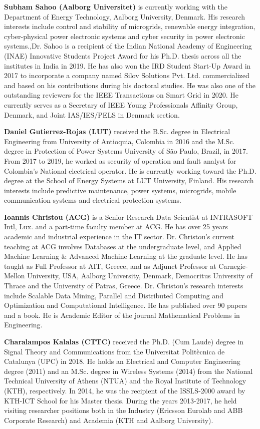 \textbf{Subham Sahoo (Aalborg Universitet)} is currently working with the Department of Energy Technology, Aalborg University, Denmark. His research interests include control and stability of microgrids, renewable energy integration, cyber-physical power electronic systems and cyber security in power electronic systems.,Dr. Sahoo is a recipient of the Indian National Academy of Engineering (INAE) Innovative Students Project Award for his Ph.D. thesis across all the institutes in India in 2019. He has also won the IRD Student Start-Up Award in 2017 to incorporate a company named Silov Solutions Pvt. Ltd. commercialized and based on his contributions during his doctoral studies. He was also one of the outstanding reviewers for the IEEE Transactions on Smart Grid in 2020. He currently serves as a Secretary of IEEE Young Professionals Affinity Group, Denmark, and Joint IAS/IES/PELS in Denmark section.

\textbf{Daniel Gutierrez-Rojas (LUT)} received the B.Sc. degree in Electrical Engineering from University of Antioquia, Colombia in 2016 and the M.Sc. degree in Protection of Power Systems University of São
Paulo, Brazil, in 2017. From 2017 to 2019, he worked as security of operation and fault analyst for Colombia’s National electrical operator. He is currently working toward the Ph.D. degree at the School of Energy Systems at LUT University, Finland. His research interests include predictive maintenance, power systems, microgrids, mobile communication systems and electrical protection systems.


\textbf{Ioannis Christou (ACG)} is a Senior Research Data Scientist at INTRASOFT Intl, Lux. and a part-time faculty member at ACG. He has over 25 years academic and industrial experience in the IT sector. Dr. Christou’s current teaching at ACG involves Databases at the undergraduate level, and Applied Machine Learning \& Advanced Machine Learning at the graduate level. He has taught as Full Professor at AIT, Greece, and as Adjunct Professor at Carnegie-Mellon University, USA, Aalborg University, Denmark, Democritus University of Thrace and the University of Patras, Greece. Dr. Christou’s research interests include Scalable Data Mining, Parallel and Distributed Computing and Optimization and Computational Intelligence. He has published over 90 papers and a book. He is Academic Editor of the journal Mathematical Problems in Engineering.

\textbf{Charalampos Kalalas (CTTC)} received the Ph.D. (Cum Laude) degree in Signal Theory and Communications from the Universitat Politècnica de Catalunya (UPC) in 2018. He holds an Electrical and Computer Engineering degree (2011) and an M.Sc. degree in Wireless Systems (2014) from the National Technical University of Athens (NTUA) and the Royal Institute of Technology (KTH), respectively. In 2014, he was the recipient of the ISSLS-2000 award by KTH-ICT School for his Master thesis. During the years 2013-2017, he held visiting researcher positions both in the Industry (Ericsson Eurolab and ABB Corporate Research) and Academia (KTH and Aalborg University).

